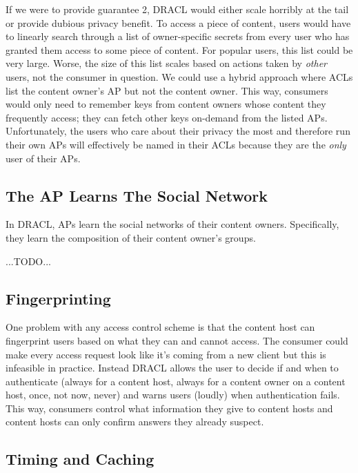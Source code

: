 \documentclass[pdftex,12pt,a4papaer]{report}
\begin{document}
If we were to provide guarantee 2, DRACL would either scale horribly at the tail
or provide dubious privacy benefit. To access a piece of content, users would
have to linearly search through a list of owner-specific secrets from every user
who has granted them access to some piece of content. For popular users, this
list could be very large. Worse, the size of this list scales based on actions
taken by \emph{other} users, not the consumer in question. We could use a hybrid
approach where ACLs list the content owner's AP but not the content owner. This
way, consumers would only need to remember keys from content owners whose
content they frequently access; they can fetch other keys on-demand from the
listed APs. Unfortunately, the users who care about their privacy the most and
therefore run their own APs will effectively be named in their ACLs because they
are the \emph{only} user of their APs.

\subsection{The AP Learns The Social Network}

In DRACL, APs learn the social networks of their content owners. Specifically,
they learn the composition of their content owner's groups.

...TODO...

\subsection{Fingerprinting}
\label{sub:fingerprinting}

One problem with any access control scheme is that the content host can
fingerprint users based on what they can and cannot access. The consumer could
make every access request look like it's coming from a new client but this is
infeasible in practice. Instead DRACL allows the user to decide if and when to
authenticate (always for a content host, always for a content owner on a content
host, once, not now, never) and warns users (loudly) when authentication fails.
This way, consumers control what information they give to content hosts and
content hosts can only confirm answers they already suspect.

\subsection{Timing and Caching}
\end{document}
